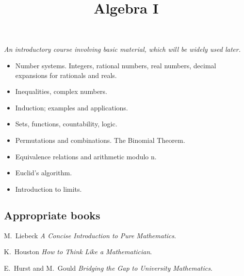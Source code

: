 \documentclass[twoside]{scrartcl}
\title{Algebra I}
\begin{document}
{
{\Large\bfseries{}}

\textit{An introductory course involving basic material, which will be widely used later.}

\begin{itemize}
\item Number systems. Integers, rational numbers, real numbers, decimal expansions for rationals and
reals. 
\item Inequalities, complex numbers.
\item Induction; examples and applications.
\item  Sets, functions, countability, logic.
\item Permutations and combinations. The Binomial Theorem.
\item Equivalence relations and arithmetic modulo n.
\item Euclid’s algorithm.
\item Introduction to limits.
\end{itemize}

\subsection*{Appropriate books}

{\shortskip
M.~Liebeck \emph{A Concise Introduction to Pure Mathematics}.

K.~Houston \emph{How to Think Like a Mathematician}. 

E.~Hurst and M.~Gould \emph{Bridging the Gap to University Mathematics}. 
}}

\TableofContents

\end{document}

